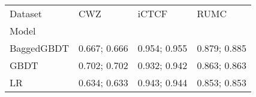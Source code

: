\begin{tabular}{llll}
\toprule
Dataset &            CWZ &          iCTCF &           RUMC \\
Model      &                &                &                \\
\midrule
BaggedGBDT &  0.667;  0.666 &  0.954;  0.955 &  0.879;  0.885 \\
GBDT       &  0.702;  0.702 &  0.932;  0.942 &  0.863;  0.863 \\
LR         &  0.634;  0.633 &  0.943;  0.944 &  0.853;  0.853 \\
\bottomrule
\end{tabular}

